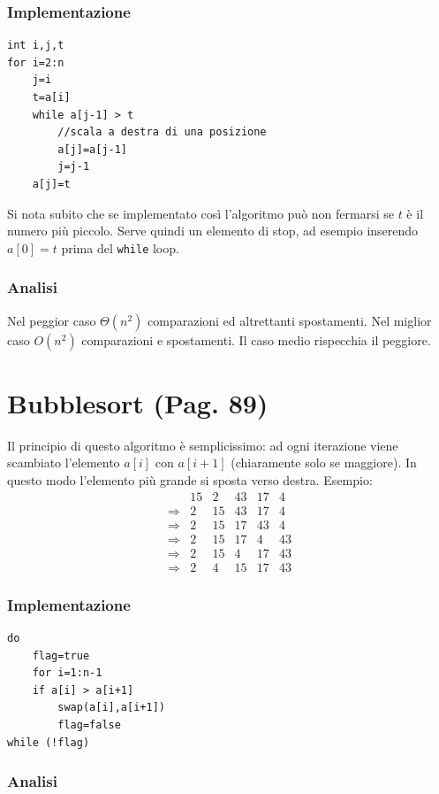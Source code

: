 \documentclass[a4paper]{book}
\newcommand{\inline}[1]{\lstinline!#1!}%
\newcommand{\lstIndent}{4}
\begin{document}
\subsubsection*{Implementazione}
\begin{lstlisting}[tabsize=\lstIndent]
int i,j,t
for i=2:n
	j=i
	t=a[i]
	while a[j-1] > t
		//scala a destra di una posizione
		a[j]=a[j-1]
		j=j-1
	a[j]=t
\end{lstlisting}
Si nota subito che se implementato così l'algoritmo può non fermarsi se $t$ è il numero più piccolo. Serve quindi un elemento di stop, ad esempio inserendo $a[0]=t$ prima del \inline{while} loop.

\subsubsection*{Analisi}

Nel peggior caso $\Theta (n^2)$ comparazioni ed altrettanti spostamenti. Nel miglior caso $O(n^2)$ comparazioni e spostamenti. Il caso medio rispecchia il peggiore.

\section{Bubblesort (Pag. 89)}
Il principio di questo algoritmo è semplicissimo: ad ogni iterazione viene scambiato l'elemento $a[i]$ con $a[i+1]$ (chiaramente solo se maggiore). In questo modo l'elemento più grande si sposta verso destra. Esempio:
\[\begin{array}{*{20}{c}}
{}&{15}&2&{43}&{17}&4\\
{\Rightarrow}&2&{15}&{43}&{17}&4\\
{\Rightarrow}&2&{15}&{17}&{43}&4\\
{\Rightarrow}&2&{15}&{17}&4&{43}\\
{\Rightarrow}&2&{15}&4&{17}&{43}\\
{\Rightarrow}&2&4&{15}&{17}&{43}
\end{array}\]
\subsubsection*{Implementazione}
\begin{lstlisting}[tabsize=\lstIndent]
do
	flag=true
	for i=1:n-1
	if a[i] > a[i+1] 
		swap(a[i],a[i+1])
		flag=false
while (!flag)
\end{lstlisting}
\subsubsection*{Analisi}
\end{document}
